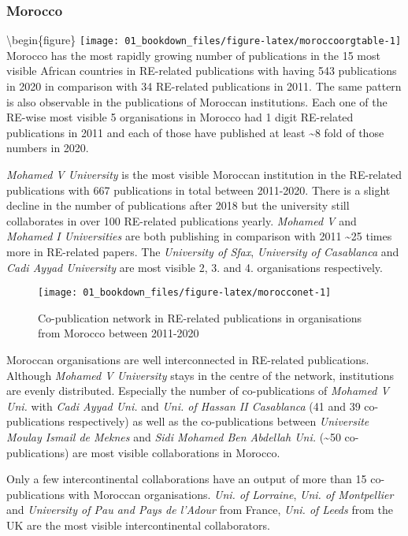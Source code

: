 \documentclass[12pt,twoside]{report}
\begin{document}
\hypertarget{morocco}{%
\subsubsection{Morocco}\label{morocco}}

\textbackslash begin\{figure\}
\texttt{[image: 01\_bookdown\_files/figure-latex/moroccoorgtable-1]}
Morocco has the most rapidly growing number of publications in the 15 most visible African countries in RE-related publications with having 543 publications in 2020 in comparison with 34 RE-related publications in 2011. The same pattern is also observable in the publications of Moroccan institutions. Each one of the RE-wise most visible 5 organisations in Morocco had 1 digit RE-related publications in 2011 and each of those have published at least \textasciitilde8 fold of those numbers in 2020.

\emph{Mohamed V University} is the most visible Moroccan institution in the RE-related publications with 667 publications in total between 2011-2020. There is a slight decline in the number of publications after 2018 but the university still collaborates in over 100 RE-related publications yearly. \emph{Mohamed V} and \emph{Mohamed I Universities} are both publishing in comparison with 2011 \textasciitilde25 times more in RE-related papers. The \emph{University of Sfax}, \emph{University of Casablanca} and \emph{Cadi Ayyad University} are most visible 2, 3. and 4. organisations respectively.

\begin{figure}
\texttt{[image: 01\_bookdown\_files/figure-latex/morocconet-1]} \caption{Co-publication network in RE-related publications in organisations from Morocco between 2011-2020}\label{fig:morocconet}
\end{figure}

Moroccan organisations are well interconnected in RE-related publications. Although \emph{Mohamed V University} stays in the centre of the network, institutions are evenly distributed. Especially the number of co-publications of \emph{Mohamed V Uni.} with \emph{Cadi Ayyad Uni.} and \emph{Uni. of Hassan II Casablanca} (41 and 39 co-publications respectively) as well as the co-publications between \emph{Universite Moulay Ismail de Meknes} and \emph{Sidi Mohamed Ben Abdellah Uni.} (\textasciitilde50 co-publications) are most visible collaborations in Morocco.

Only a few intercontinental collaborations have an output of more than 15 co-publications with Moroccan organisations. \emph{Uni. of Lorraine}, \emph{Uni. of Montpellier} and \emph{University of Pau and Pays de l'Adour} from France, \emph{Uni. of Leeds} from the UK are the most visible intercontinental collaborators.
\end{document}
